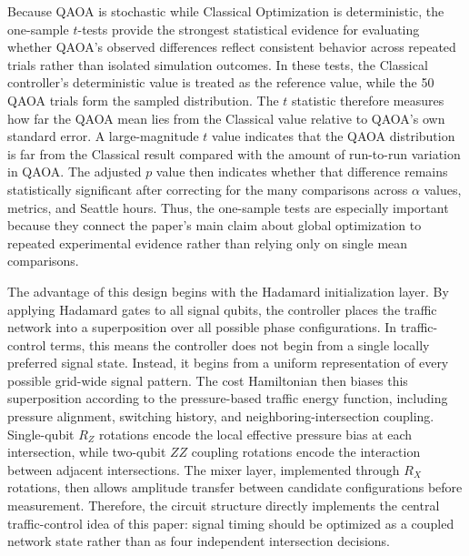 \documentclass[12pt]{article}
\begin{document}
Because QAOA is stochastic while Classical Optimization is deterministic, the one-sample $t$-tests provide the strongest statistical evidence for evaluating whether QAOA's observed differences reflect consistent behavior across repeated trials rather than isolated simulation outcomes. In these tests, the Classical controller's deterministic value is treated as the reference value, while the 50 QAOA trials form the sampled distribution. The $t$ statistic therefore measures how far the QAOA mean lies from the Classical value relative to QAOA's own standard error. A large-magnitude $t$ value indicates that the QAOA distribution is far from the Classical result compared with the amount of run-to-run variation in QAOA. The adjusted $p$ value then indicates whether that difference remains statistically significant after correcting for the many comparisons across $\alpha$ values, metrics, and Seattle hours. Thus, the one-sample tests are especially important because they connect the paper's main claim about global optimization to repeated experimental evidence rather than relying only on single mean comparisons.

The advantage of this design begins with the Hadamard initialization layer. By applying Hadamard gates to all signal qubits, the controller places the traffic network into a superposition over all possible phase configurations. In traffic-control terms, this means the controller does not begin from a single locally preferred signal state. Instead, it begins from a uniform representation of every possible grid-wide signal pattern. The cost Hamiltonian then biases this superposition according to the pressure-based traffic energy function, including pressure alignment, switching history, and neighboring-intersection coupling. Single-qubit $R_Z$ rotations encode the local effective pressure bias at each intersection, while two-qubit $ZZ$ coupling rotations encode the interaction between adjacent intersections. The mixer layer, implemented through $R_X$ rotations, then allows amplitude transfer between candidate configurations before measurement. Therefore, the circuit structure directly implements the central traffic-control idea of this paper: signal timing should be optimized as a coupled network state rather than as four independent intersection decisions.
\end{document}
